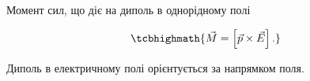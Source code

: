 \documentclass{beamer}
\begin{document}
\begin{frame}{Момент сил, що діє на диполь в однорідному полі}{}
	\begin{center}
		
	\end{center}

	\begin{equation*}
		\tcbhighmath{
			\vec{M} = \left[\vec{p}\times\vec{E}\right].
		}
	\end{equation*}

	\begin{alertblock}{}
		Диполь в електричному полі орієнтується за напрямком поля.
	\end{alertblock}
\end{frame}
\end{document}
